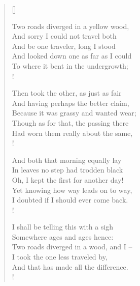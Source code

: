 \documentclass[11pt, a4paper]{article} %
\begin{document}


\settowidth{\versewidth}{Because it was grassy and wanted wear;} %

\begin{verse}[\versewidth]

Two roads diverged in a yellow wood, \\
And sorry I could not travel both \\
And be one traveler, long I stood \\
And looked down one as far as I could \\
To where it bent in the undergrowth; \\!


Then took the other, as just as fair \\
And having perhaps the better claim, \\
Because it was grassy and wanted wear; \\
Though as for that, the passing there \\
Had worn them really about the same, \\!


And both that morning equally lay \\
In leaves no step had trodden black \\
Oh, I kept the first for another day! \\
Yet knowing how way leads on to way, \\
I doubted if I should ever come back. \\!


I shall be telling this with a sigh \\
Somewhere ages and ages hence: \\
Two roads diverged in a wood, and I -- \\
I took the one less traveled by, \\
And that has made all the difference. \\!

\end{verse}
\end{document}
